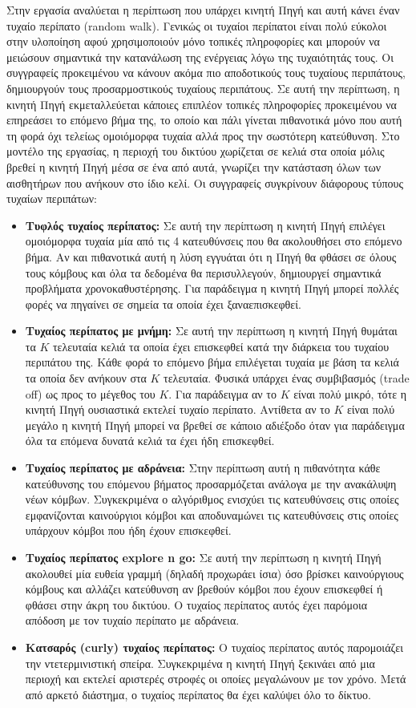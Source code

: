 Στην εργασία \cite{marios_randomwalks_1} αναλύεται η περίπτωση που υπάρχει κινητή Πηγή και αυτή κάνει έναν τυχαίο περίπατο (random walk). Γενικώς οι τυχαίοι
περίπατοι είναι πολύ εύκολοι στην υλοποίηση αφού χρησιμοποιούν μόνο τοπικές πληροφορίες και μπορούν να μειώσουν σημαντικά την κατανάλωση της ενέργειας λόγω της
τυχαιότητάς τους. Οι συγγραφείς προκειμένου να κάνουν ακόμα πιο αποδοτικούς τους τυχαίους περιπάτους, δημιουργούν τους προσαρμοστικούς τυχαίους περιπάτους. Σε αυτή
την περίπτωση, η κινητή Πηγή εκμεταλλεύεται κάποιες επιπλέον τοπικές πληροφορίες προκειμένου να επηρεάσει το επόμενο βήμα της, το οποίο και πάλι γίνεται πιθανοτικά
μόνο που αυτή τη φορά όχι τελείως ομοιόμορφα τυχαία αλλά προς την σωστότερη κατεύθυνση. Στο μοντέλο της εργασίας, η περιοχή του δικτύου χωρίζεται σε κελιά στα οποία
μόλις βρεθεί η κινητή Πηγή μέσα σε ένα από αυτά, γνωρίζει την κατάσταση όλων των αισθητήρων που ανήκουν στο ίδιο κελί. Οι συγγραφείς συγκρίνουν διάφορους τύπους
τυχαίων περιπάτων:
\begin{itemize}
\item \textbf{Τυφλός τυχαίος περίπατος:} Σε αυτή την περίπτωση η κινητή Πηγή επιλέγει ομοιόμορφα τυχαία μία από τις 4 κατευθύνσεις που θα ακολουθήσει στο επόμενο
βήμα. Αν και πιθανοτικά αυτή η λύση εγγυάται ότι η Πηγή θα φθάσει σε όλους τους κόμβους και όλα τα δεδομένα θα περισυλλεγούν, δημιουργεί σημαντικά προβλήματα
χρονοκαθυστέρησης. Για παράδειγμα η κινητή Πηγή μπορεί πολλές φορές να πηγαίνει σε σημεία τα οποία έχει ξαναεπισκεφθεί.
\item \textbf{Τυχαίος περίπατος με μνήμη:} Σε αυτή την περίπτωση η κινητή Πηγή θυμάται τα $Κ$ τελευταία κελιά τα οποία έχει επισκεφθεί κατά την διάρκεια του τυχαίου
περιπάτου της. Κάθε φορά το επόμενο βήμα επιλέγεται τυχαία με βάση τα κελιά τα οποία δεν ανήκουν στα $Κ$ τελευταία. Φυσικά υπάρχει ένας συμβιβασμός (trade off) ως
προς το μέγεθος του $K$. Για παράδειγμα αν το $K$ είναι πολύ μικρό, τότε η κινητή Πηγή ουσιαστικά εκτελεί τυχαίο περίπατο. Αντίθετα αν το $Κ$ είναι πολύ μεγάλο η
κινητή Πηγή μπορεί να βρεθεί σε κάποιο αδιέξοδο όταν για παράδειγμα όλα τα επόμενα δυνατά κελιά τα έχει ήδη επισκεφθεί.
\item \textbf{Τυχαίος περίπατος με αδράνεια:} Στην περίπτωση αυτή η πιθανότητα κάθε κατεύθυνσης του επόμενου βήματος προσαρμόζεται ανάλογα με την ανακάλυψη νέων
κόμβων. Συγκεκριμένα ο αλγόριθμος ενισχύει τις κατευθύνσεις στις οποίες εμφανίζονται καινούργιοι κόμβοι και αποδυναμώνει τις κατευθύνσεις στις οποίες υπάρχουν κόμβοι
που ήδη έχουν επισκεφθεί.
\item \textbf{Τυχαίος περίπατος explore n go:} Σε αυτή την περίπτωση η κινητή Πηγή ακολουθεί μία ευθεία γραμμή (δηλαδή προχωράει ίσια) όσο βρίσκει καινούργιους
κόμβους και αλλάζει κατεύθυνση αν βρεθούν κόμβοι που έχουν επισκεφθεί ή φθάσει στην άκρη του δικτύου. Ο τυχαίος περίπατος αυτός έχει παρόμοια απόδοση με τον τυχαίο
περίπατο με αδράνεια.
\item \textbf{Κατσαρός (curly) τυχαίος περίπατος:} Ο τυχαίος περίπατος αυτός παρομοιάζει την ντετερμινιστική σπείρα. Συγκεκριμένα η κινητή Πηγή ξεκινάει από μια
περιοχή και εκτελεί αριστερές στροφές οι οποίες μεγαλώνουν με τον χρόνο. Μετά από αρκετό διάστημα, ο τυχαίος περίπατος θα έχει καλύψει όλο το δίκτυο.
\end{itemize}

